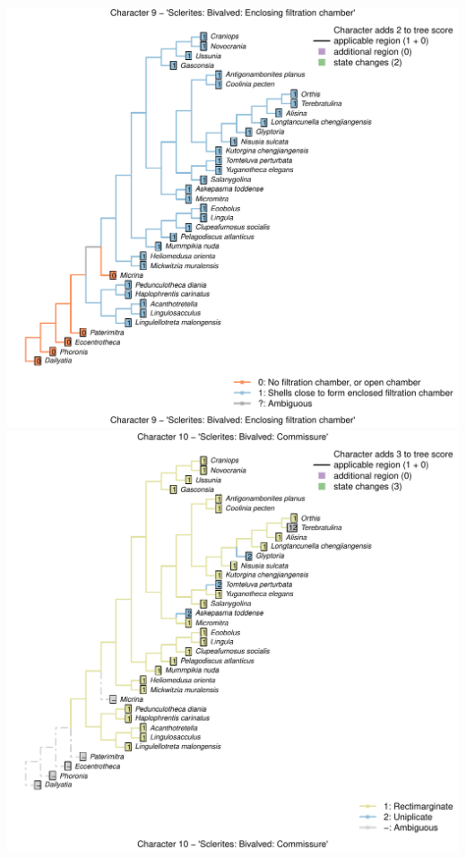 \documentclass[]{book}
\theoremstyle{definition}
\theoremstyle{definition}
\theoremstyle{definition}
\theoremstyle{remark}
\begin{document}
\includegraphics{Brachiopod_phylogeny_files/figure-latex/unnamed-chunk-4-9.pdf}
\includegraphics{Brachiopod_phylogeny_files/figure-latex/unnamed-chunk-4-10.pdf}
\end{document}
